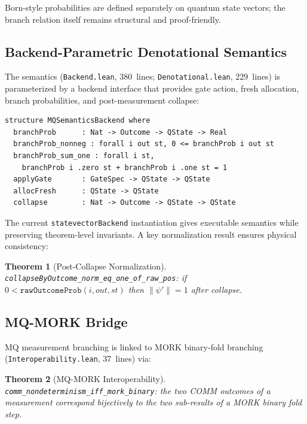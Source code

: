 \documentclass[11pt]{article}
\newtheorem{theorem}{Theorem}[section]
\theoremstyle{definition}
\theoremstyle{remark}
\begin{document}
\noindent
Born-style probabilities are defined separately on quantum state
vectors; the branch relation itself remains structural and
proof-friendly.

\subsection{Backend-Parametric Denotational Semantics}

The semantics (\texttt{Backend.lean}, 380~lines;
\texttt{Denotational.lean}, 229~lines) is parameterized by a backend
interface that provides gate action, fresh allocation, branch
probabilities, and post-measurement collapse:

\begin{lstlisting}[caption={Backend interface (from \texttt{Backend.lean})}]
structure MQSemanticsBackend where
  branchProb      : Nat -> Outcome -> QState -> Real
  branchProb_nonneg : forall i out st, 0 <= branchProb i out st
  branchProb_sum_one : forall i st,
    branchProb i .zero st + branchProb i .one st = 1
  applyGate       : GateSpec -> QState -> QState
  allocFresh      : QState -> QState
  collapse        : Nat -> Outcome -> QState -> QState
\end{lstlisting}

\noindent
The current \texttt{statevectorBackend} instantiation gives executable
semantics while preserving theorem-level invariants.  A key
normalization result ensures physical consistency:

\begin{theorem}[Post-Collapse Normalization]
\texttt{collapseByOutcome\_norm\_eq\_one\_of\_raw\_pos}:
if $0 < \texttt{rawOutcomeProb}(i, \mathit{out}, \mathit{st})$ then
$\|\psi'\| = 1$ after collapse.
\end{theorem}

\subsection{MQ-MORK Bridge}

MQ measurement branching is linked to MORK binary-fold branching
(\texttt{Interoperability.lean}, 37~lines) via:

\begin{theorem}[MQ-MORK Interoperability]
\texttt{comm\_nondeterminism\_iff\_mork\_binary}: the two COMM outcomes
of a measurement correspond bijectively to the two sub-results of
a MORK binary fold step.
\end{theorem}
\end{document}
